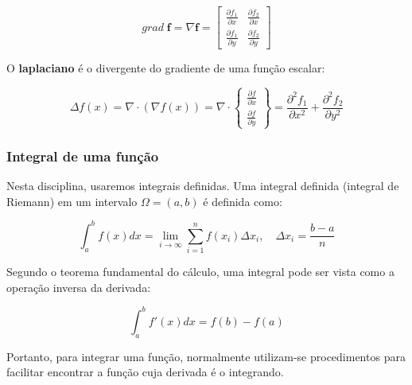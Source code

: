         \begin{equation*}
            grad \; \mathbf{f} = 
            \nabla \mathbf{f} = 
            \begin{bmatrix}
                \frac{\partial f_1}{\partial x} & \frac{\partial f_2}{\partial x} \\
                \frac{\partial f_1}{\partial y} & \frac{\partial f_2}{\partial y}
            \end{bmatrix}
        \end{equation*}

        O \textbf{laplaciano} é o divergente do gradiente de uma função escalar:

        \begin{equation*}
            \Delta f(x) = \nabla \cdot \left(\nabla f(x)\right) = \nabla \cdot 
            \begin{Bmatrix}
                \frac{\partial f}{\partial x}\\
                \frac{\partial f}{\partial y}
            \end{Bmatrix} =
            \frac{\partial^2 f_1}{\partial x^2} + \frac{\partial^2 f_2}{\partial y^2}
        \end{equation*}


        \subsubsection*{Integral de uma função}

        Nesta disciplina, usaremos integrais definidas. Uma integral definida (integral de Riemann) em um intervalo $\Omega = (a,b)$ é definida como:
        
        \begin{equation*}
            \int_{a}^{b} f(x) dx = \lim_{i\rightarrow\infty} \sum_{i=1}^n f(x_i) \Delta x_i, \quad \Delta x_i = \frac{b-a}{n}
        \end{equation*}

        Segundo o teorema fundamental do cálculo, uma integral pode ser vista como a operação inversa da derivada:

        \begin{equation}
            \int_{a}^{b} f'(x) dx = f(b)-f(a)
        \end{equation}

        Portanto, para integrar uma função, normalmente utilizam-se procedimentos para facilitar encontrar a função cuja derivada é o integrando. 
        
